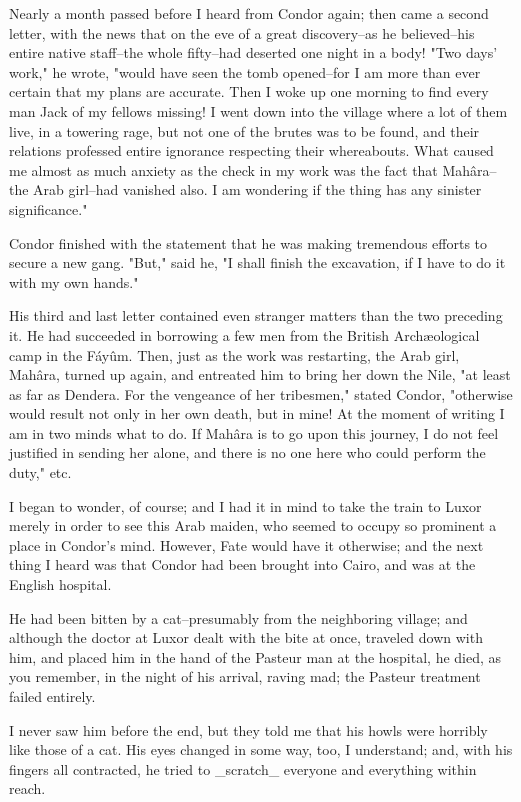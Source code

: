 Nearly a month passed before I heard from Condor again; then came a
second letter, with the news that on the eve of a great discovery--as
he believed--his entire native staff--the whole fifty--had deserted
one night in a body! "Two days' work," he wrote, "would have seen the
tomb opened--for I am more than ever certain that my plans are
accurate. Then I woke up one morning to find every man Jack of my
fellows missing! I went down into the village where a lot of them
live, in a towering rage, but not one of the brutes was to be found,
and their relations professed entire ignorance respecting their
whereabouts. What caused me almost as much anxiety as the check in my
work was the fact that Mahâra--the Arab girl--had vanished also. I am
wondering if the thing has any sinister significance."

Condor finished with the statement that he was making tremendous
efforts to secure a new gang. "But," said he, "I shall finish the
excavation, if I have to do it with my own hands."

His third and last letter contained even stranger matters than the two
preceding it. He had succeeded in borrowing a few men from the British
Archæological camp in the Fáyûm. Then, just as the work was
restarting, the Arab girl, Mahâra, turned up again, and entreated him
to bring her down the Nile, "at least as far as Dendera. For the
vengeance of her tribesmen," stated Condor, "otherwise would result
not only in her own death, but in mine! At the moment of writing I am
in two minds what to do. If Mahâra is to go upon this journey, I do
not feel justified in sending her alone, and there is no one here who
could perform the duty," etc.

I began to wonder, of course; and I had it in mind to take the train
to Luxor merely in order to see this Arab maiden, who seemed to occupy
so prominent a place in Condor's mind. However, Fate would have it
otherwise; and the next thing I heard was that Condor had been brought
into Cairo, and was at the English hospital.

He had been bitten by a cat--presumably from the neighboring village;
and although the doctor at Luxor dealt with the bite at once, traveled
down with him, and placed him in the hand of the Pasteur man at the
hospital, he died, as you remember, in the night of his arrival,
raving mad; the Pasteur treatment failed entirely.

I never saw him before the end, but they told me that his howls were
horribly like those of a cat. His eyes changed in some way, too, I
understand; and, with his fingers all contracted, he tried to
_scratch_ everyone and everything within reach.

